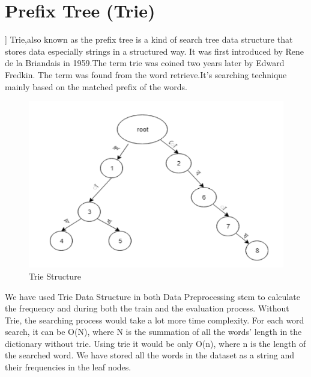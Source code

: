 \documentclass{standalone}
\begin{document}
\section {Prefix Tree (Trie)}]
Trie,also known as the prefix tree is a kind of search tree data structure that stores data especially strings in a structured way. It was first introduced by Rene de la Briandais in 1959\cite{de1959file}\cite{trie}.The term trie was coined two years later by Edward Fredkin\cite{black1998dictionary}\cite{trie}. The term was found from the word retrieve\cite{trie}.It's searching technique mainly based on the matched prefix of the words.\\
\begin{figure}[h!]
\centering
\includegraphics[width=1.0\columnwidth]{img/trie.png}
\caption{Trie Structure}
\label{trie}
\end{figure}
We have used Trie Data Structure in both Data Preprocessing stem to calculate the frequency and during both the train and the evaluation process. Without Trie, the searching process would take a lot more time complexity. For each word search, it can be O(N), where N is the summation of all the words’ length in the dictionary without trie. Using trie it would be only O(n), where n is the length of the searched word. We have stored all the words in the dataset as a string and their frequencies in the leaf nodes. 
\end{document}
